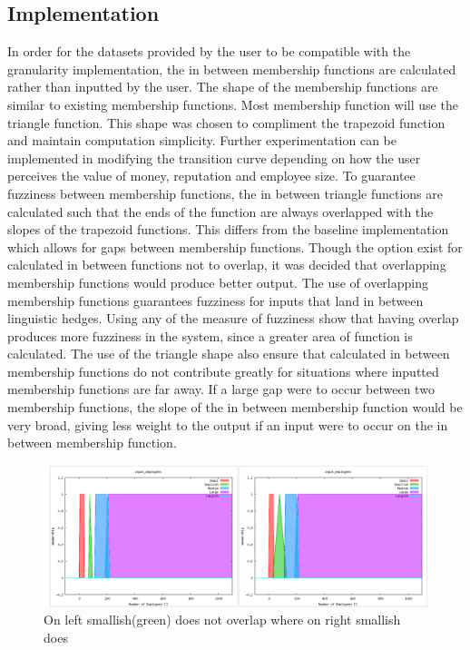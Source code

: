 \documentclass[12pt,fleqn,reqno,letterpaper]{article}
\begin{document}
\subsection{Implementation}
In order for the datasets provided by the user to be compatible with the granularity implementation, the in between membership functions are calculated rather than inputted by the user.  The shape of the membership functions are similar to existing membership functions.  Most membership function will use the triangle function.  This shape was chosen to compliment the trapezoid function and maintain computation simplicity.  Further experimentation can be implemented in modifying the transition curve depending on how the user perceives the value of money, reputation and employee size.  To guarantee fuzziness between membership functions, the in between triangle functions are calculated such that the ends of the function are always overlapped with the slopes of the trapezoid functions.  This differs from the baseline implementation which allows for gaps between membership functions.  Though the option exist for calculated in between functions not to overlap, it was decided that overlapping membership functions would produce better output.  The use of overlapping membership functions guarantees fuzziness for inputs that land in between linguistic hedges.  Using any of the measure of fuzziness show that having overlap produces more fuzziness in the system, since a greater area of function is calculated.  The use of the triangle shape also ensure that calculated in between membership functions do not contribute greatly for situations where inputted membership functions are far away.  If a large gap were to occur between two membership functions, the slope of the in between membership function would be very broad, giving less weight to the output if an input were to occur on the in between membership function.

\begin{figure}[H]
  \centering
  \includegraphics[scale=0.5,natwidth=1360,natheight=504]{fig/crossover.png}
  \caption{On left smallish(green) does not overlap where on right smallish does}
  \label{fig:CROSSOVER}
\end{figure}
\end{document}
